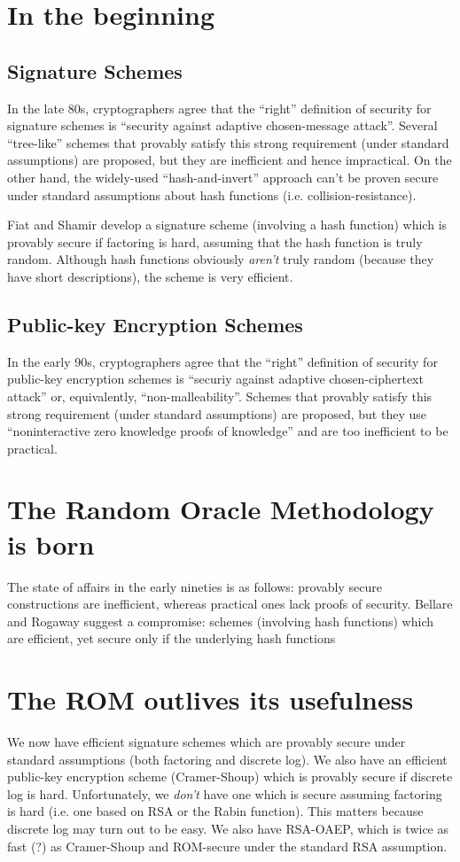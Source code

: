 \documentclass[12pt,twoside]{article}
\theoremstyle{plain}
\begin{document}
\section*{In the beginning}
\subsection*{Signature Schemes}
In the late 80s, cryptographers agree that the ``right'' definition of security for
signature schemes is ``security against adaptive chosen-message attack''.
Several ``tree-like'' schemes that provably satisfy this strong
requirement (under standard assumptions) are proposed, but they are
inefficient and hence impractical. On the other hand,
the widely-used ``hash-and-invert'' approach can't be proven secure under
standard assumptions about hash functions (i.e. collision-resistance).

Fiat and Shamir develop a signature scheme (involving a hash function) which is provably secure if
factoring is hard, assuming that the hash function is truly random. Although
hash functions obviously \emph{aren't} truly random (because they have short
descriptions), the scheme is very efficient. 

\subsection*{Public-key Encryption Schemes}
In the early 90s, cryptographers agree that the ``right'' definition of
security for public-key encryption schemes is ``securiy against adaptive
chosen-ciphertext attack'' or, equivalently, ``non-malleability''.
Schemes that provably satisfy this strong requirement (under standard
assumptions) are proposed, but they use ``noninteractive zero knowledge proofs
of knowledge'' and are too inefficient to be practical.

\section*{The Random Oracle Methodology is born}
The state of affairs in the early nineties is as follows: provably secure constructions are inefficient, whereas practical ones lack
proofs of security. Bellare and Rogaway suggest a compromise: schemes
(involving hash functions) which are efficient, yet secure only if the
underlying hash functions 

\section*{The ROM outlives its usefulness}
We now have efficient signature schemes which are provably secure under standard
assumptions (both factoring and discrete log). We also have an efficient public-key encryption
scheme (Cramer-Shoup) which is provably secure if discrete log is hard.
Unfortunately, we \emph{don't} have one
which is secure assuming factoring is hard (i.e. one based on RSA or the Rabin
function). This matters because discrete log may turn out to be easy. We also have RSA-OAEP, which is twice as fast (?) as Cramer-Shoup
and ROM-secure under the standard RSA assumption. 
\end{document}
